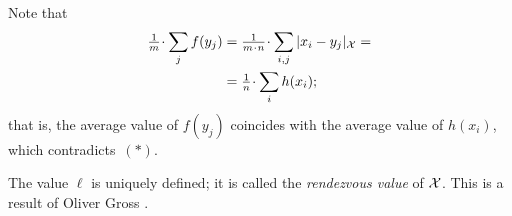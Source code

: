 Note that
\begin{align*}\tfrac1m\cdot\sum_j f(y_j)&=\tfrac1{m\cdot n}\cdot\sum_{i,j}|x_i-y_j|_{\spc{X}}=
\\
&=\tfrac1n\cdot\sum_i h(x_i);
\end{align*}
that is, the average value of $f(y_j)$ coincides with the average value of $h(x_i)$, 
which contradicts~$({*})$.

The value $\ell$ is uniquely defined;
it is called the \emph{rendezvous value} of ${\mathcal{X}}$.
This is a result of Oliver Gross \cite{gross}.

